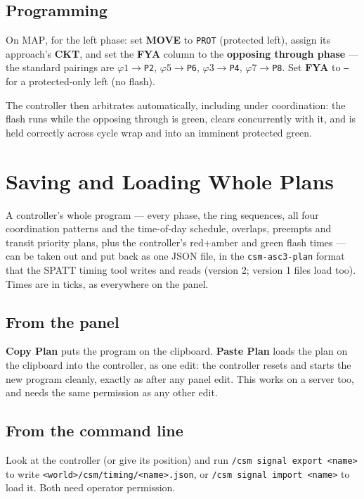 \documentclass[11pt]{article}
\newcommand{\ph}[1]{\ensuremath{\varphi#1}}
\newcommand{\field}[1]{\textsf{\textbf{#1}}}
\newcommand{\screen}[1]{\textsc{#1}}
\begin{document}
\subsection{Programming}

On \screen{MAP}, for the left phase: set \field{MOVE} to \texttt{PROT} (protected
left), assign its approach's \field{CKT}, and set the \field{FYA} column to the
\textbf{opposing through phase} — the standard pairings are
\ph{1}$\to$\texttt{P2}, \ph{5}$\to$\texttt{P6}, \ph{3}$\to$\texttt{P4},
\ph{7}$\to$\texttt{P8}. Set \field{FYA} to \texttt{--} for a protected-only left
(no flash).

The controller then arbitrates automatically, including under coordination: the
flash runs while the opposing through is green, clears concurrently with it, and is
held correctly across cycle wrap and into an imminent protected green.

\section{Saving and Loading Whole Plans}\label{sec:planjson}

A controller's whole program --- every phase, the ring sequences, all four
coordination patterns and the time-of-day schedule, overlaps, preempts and transit
priority plans, plus the controller's red+amber and green flash times --- can be
taken out and put back as one JSON file, in the \texttt{csm-asc3-plan} format that
the SPATT timing tool writes and reads (version 2; version 1 files load too). Times
are in ticks, as everywhere on the panel.

\subsection{From the panel}

\textbf{Copy Plan} puts the program on the clipboard. \textbf{Paste Plan} loads the
plan on the clipboard into the controller, as one edit: the controller resets and
starts the new program cleanly, exactly as after any panel edit. This works on a
server too, and needs the same permission as any other edit.

\subsection{From the command line}

Look at the controller (or give its position) and run
\texttt{/csm signal export <name>} to write
\texttt{<world>/csm/timing/<name>.json}, or \texttt{/csm signal import <name>} to
load it. Both need operator permission.
\end{document}
